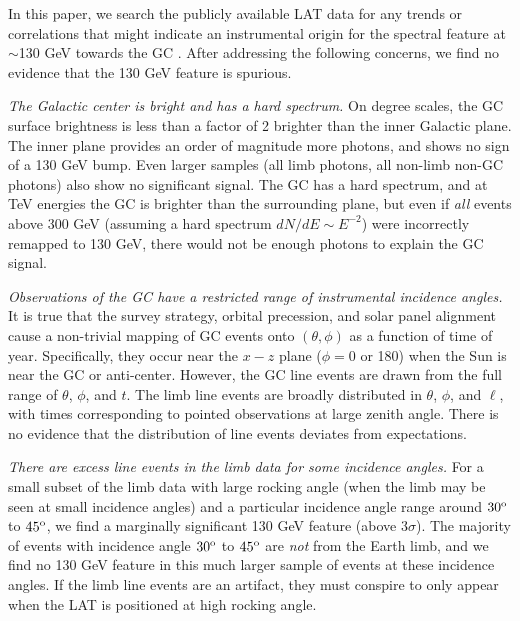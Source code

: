 \documentclass[aps,twocolumn,prd,superscriptaddress,showpacs,nofootinbib,fixfloat]{revtex4}
\newcommand{\degree}{^{\rm o}}
\begin{document}
In this paper, we search the publicly available LAT data for any trends or
correlations that might indicate an instrumental origin for the spectral
feature at $\sim$130 GeV towards the GC \citep{Bringmann:2012, Weniger:2012, linepaper}. 
After addressing the following concerns, we find no evidence that the 130 GeV
feature is spurious. 
\medskip

\emph{The Galactic center is bright and has a hard spectrum.} On degree
scales, the GC surface brightness is less than a factor of 2 brighter than the
inner Galactic plane.  The inner plane provides an order of magnitude more
photons, and shows no sign of a 130 GeV bump.  Even larger samples (all limb
photons, all non-limb non-GC photons) also show no significant signal.  The GC has a hard
spectrum, and at TeV energies the
GC is brighter than the surrounding plane, but even if \emph{all} events above
300 GeV (assuming a hard spectrum $dN/dE\sim E^{-2}$) were incorrectly remapped
to 130 GeV, there would not be enough photons to explain the GC signal.

\emph{Observations of the GC have a restricted range of instrumental incidence
  angles.}  It is true that the survey strategy, orbital precession, and solar
panel alignment cause a non-trivial mapping of GC events onto $(\theta, \phi)$
as a function of time of year.  Specifically, they occur near the $x-z$ plane
($\phi=0$ or 180) when the Sun is near the GC or anti-center.  However, the GC
line events are drawn from the full range of $\theta$, $\phi$, and $t$.  The
limb line events are broadly distributed in $\theta$, $\phi$, and $\ell$, with
times corresponding to pointed observations at large zenith angle.  There is no
evidence that the distribution of line events deviates from expectations.

\emph{There are excess line events in the limb data for some incidence angles.}
For a small subset of the limb data with large rocking angle (when the limb may
be seen at small incidence angles) and a particular incidence angle range
around $30\degree$ to $45\degree$, we find a marginally significant 130 GeV feature
(above $3\sigma$).  
The majority of events with incidence angle $30\degree$ to
$45\degree$ are \emph{not} from the Earth limb, and we find no 130 GeV
feature in this much larger sample of events at these incidence angles.  If the
limb line events are an artifact, they must conspire to only appear when the
LAT is positioned at high rocking angle. 
\end{document}
